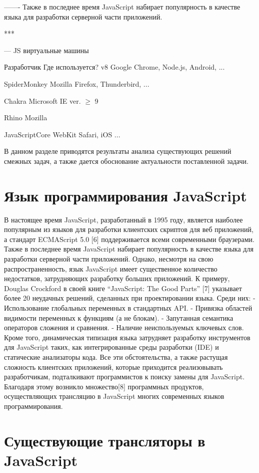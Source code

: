 -------
Также в последнее время JavaScript набирает популярность в качестве языка для разработки серверной части приложений.

***


---
JS виртуальные машины

 
Разработчик
Где используется?
v8
Google
Chrome, Node.js,
Android, ...

SpiderMonkey
Mozilla 
Firefox,
Thunderbird, ...

Chakra
Microsoft
IE ver. $\geq$ 9

Rhino
Mozilla
 
JavaScriptCore
WebKit
Safari, iOS ...




В данном разделе приводятся результаты анализа существующих решений смежных
задач, а также дается обоснование актуальности поставленной задачи.

\section{Язык программирования JavaScript}

В настоящее время JavaScript, разработанный в 1995 году, является наиболее
популярным из языков для разработки клиентских скриптов для веб приложений, а стандарт
ECMAScript 5.0 [6] поддерживается всеми современными браузерами. Также в последнее
время JavaScript набирает популярность в качестве языка для разработки серверной части
приложений.
Однако, несмотря на свою распространенность, язык JavaScript имеет существенное
количество недостатков, затрудняющих разработку больших приложений. К примеру,
Douglas Crockford
в своей книге “JavaScript: The Good Parts” [7] указывает более 20
неудачных решений, сделанных при проектировании языка. Среди них:
- Использование глобальных переменных в стандартных API.
- Привязка областей видимости переменных к функциям (а не блокам).
- Запутанная семантика операторов сложения и сравнения.
- Наличие неиспользуемых ключевых слов.
Кроме того, динамическая типизация языка затрудняет разработку инструментов для
JavaScript таких, как интегрированные среды разработки (IDE) и статические анализаторы
кода.
Все эти обстоятельства, а также растущая сложность клиентских приложений,
которые приходится реализовывать разработчикам, подталкивают программистов к поиску
замены для JavaScript. Благодаря этому возникло множество[8] программных продуктов,
осуществляющих трансляцию в JavaScript многих современных языков программирования.


\section{Существующие трансляторы в JavaScript}

